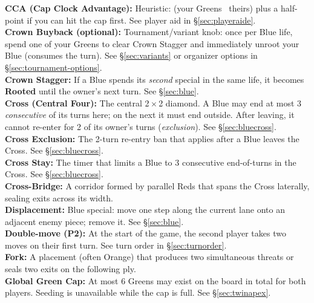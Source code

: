 \documentclass[11pt]{article}
\begin{document}
\textbf{CCA (Cap Clock Advantage):} Heuristic: (your Greens \minus\ theirs) plus a half-point if you can hit the cap first. See player aid in \S\ref{sec:playeraide}.\\

\textbf{Crown Buyback (optional):} Tournament/variant knob: once per Blue life, spend one of your Greens to clear Crown Stagger and immediately unroot your Blue (consumes the turn). See \S\ref{sec:variants} or organizer options in \S\ref{sec:tournament-options}.\\

\textbf{Crown Stagger:} If a Blue spends its \emph{second} special in the same life, it becomes \textbf{Rooted} until the owner’s next turn. See \S\ref{sec:blue}.\\

\textbf{Cross (Central Four):} The central 2\,$\times$\,2 diamond. A Blue may end at most 3 \emph{consecutive} of its turns here; on the next it must end outside. After leaving, it cannot re-enter for 2 of its owner’s turns (\emph{exclusion}). See \S\ref{sec:bluecross}.\\

\textbf{Cross Exclusion:} The 2-turn re-entry ban that applies after a Blue leaves the Cross. See \S\ref{sec:bluecross}.\\

\textbf{Cross Stay:} The timer that limits a Blue to 3 consecutive end-of-turns in the Cross. See \S\ref{sec:bluecross}.\\

\textbf{Cross-Bridge:} A corridor formed by parallel Reds that spans the Cross laterally, sealing exits across its width.\\

\textbf{Displacement:} Blue special: move one step along the current lane onto an adjacent enemy piece; remove it. See \S\ref{sec:blue}.\\

\textbf{Double-move (P2):} At the start of the game, the second player takes two moves on their first turn. See turn order in \S\ref{sec:turnorder}.\\

\textbf{Fork:} A placement (often Orange) that produces two simultaneous threats or seals two exits on the following ply.\\

\textbf{Global Green Cap:} At most 6 Greens may exist on the board in total for both players. Seeding is unavailable while the cap is full. See \S\ref{sec:twinapex}.\\
\end{document}
